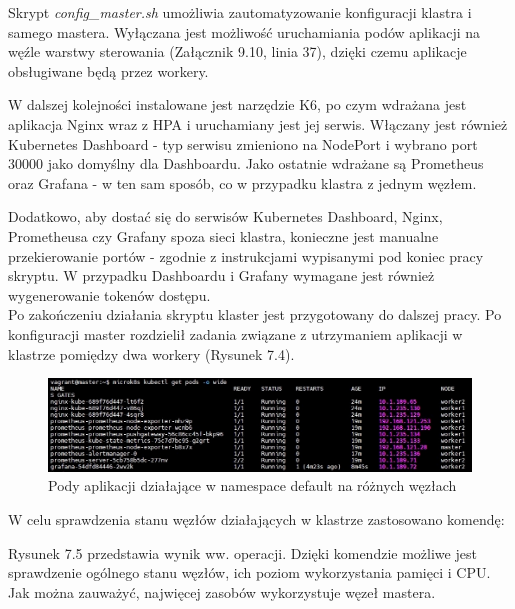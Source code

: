 Skrypt \textit{config\_master.sh} umożliwia zautomatyzowanie konfiguracji klastra i samego mastera. Wyłączana jest możliwość uruchamiania podów aplikacji na węźle warstwy sterowania (Załącznik 9.10, linia 37), dzięki czemu aplikacje obsługiwane będą przez workery. 


W dalszej kolejności instalowane jest narzędzie K6, po czym wdrażana jest aplikacja Nginx wraz z HPA i uruchamiany jest jej serwis. Włączany jest również Kubernetes Dashboard - typ serwisu zmieniono na NodePort i wybrano port 30000 jako domyślny dla Dashboardu. Jako ostatnie wdrażane są Prometheus oraz Grafana - w ten sam sposób, co w przypadku klastra z jednym węzłem. 

Dodatkowo, aby dostać się do serwisów Kubernetes Dashboard, Nginx, Prometheusa czy Grafany spoza sieci klastra, konieczne jest manualne przekierowanie portów - zgodnie z instrukcjami wypisanymi pod koniec pracy skryptu. W przypadku Dashboardu i Grafany wymagane jest również wygenerowanie tokenów dostępu.\\

Po zakończeniu działania skryptu klaster jest przygotowany do dalszej pracy. Po konfiguracji master rozdzielił zadania związane z utrzymaniem aplikacji w klastrze pomiędzy dwa workery (Rysunek 7.4).

\begin{figure}[H]
    \centering
    \includegraphics[width=1\textwidth]{img2/apps-wide.jpg}
    \caption{Pody aplikacji działające w namespace default na różnych węzłach}
\end{figure}



\newpage
W celu sprawdzenia stanu węzłów działających w klastrze zastosowano komendę:


Rysunek 7.5 przedstawia wynik ww. operacji. Dzięki komendzie możliwe jest sprawdzenie ogólnego stanu węzłów, ich poziom wykorzystania pamięci i CPU. Jak można zauważyć, najwięcej zasobów wykorzystuje węzeł mastera.

